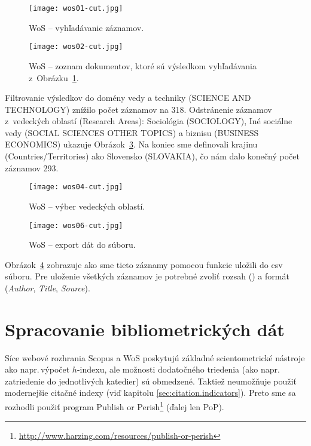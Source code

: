 \begin{figure}
  \centering
  \texttt{[image: wos01-cut.jpg]}
  \caption{WoS -- vyhľadávanie záznamov.}
  \label{fig:wos.search}
\end{figure}

\begin{figure}
  \centering
  \texttt{[image: wos02-cut.jpg]}
  \caption{WoS -- zoznam dokumentov, ktoré sú výsledkom vyhľadávania
    z~Obrázku~\ref{fig:wos.search}.}
  \label{fig:wos.documentlist}
\end{figure}

Filtrovanie výsledkov do domény vedy a techniky (SCIENCE AND TECHNOLOGY) znížilo
počet záznamov na 318.  Odstránenie záznamov z~vedeckých oblastí (Research
Areas): Sociológia (SOCIOLOGY), Iné sociálne vedy (SOCIAL SCIENCES OTHER TOPICS)
a biznisu (BUSINESS ECONOMICS) ukazuje Obrázok~\ref{fig:wos.areaselection}.  Na
koniec sme definovali krajinu (Countries/Territories) ako Slovensko (SLOVAKIA),
čo nám dalo konečný počet záznamov 293.

\begin{figure}
  \centering
  \texttt{[image: wos04-cut.jpg]}
  \caption{WoS -- výber vedeckých oblastí.}
  \label{fig:wos.areaselection}
\end{figure}

\begin{figure}
  \centering
  \texttt{[image: wos06-cut.jpg]}
  \caption{WoS -- export dát do súboru.}
  \label{fig:wos.export}
\end{figure}

Obrázok~\ref{fig:wos.export} zobrazuje ako sme tieto záznamy pomocou funkcie
 uložili do csv súboru.  Pre uloženie všetkých
záznamov je potrebné zvoliť rozsah () a formát (\emph{Author},
\emph{Title}, \emph{Source}).


\section{Spracovanie bibliometrických dát}

Síce webové rozhrania Scopus a WoS poskytujú základné scientometrické nástroje
ako napr.\,výpočet $h$-indexu, ale možnosti dodatočného triedenia (ako
napr.\,zatriedenie do jednotlivých katedier) sú obmedzené.  Taktiež neumožňuje
použiť modernejšie citačné indexy (viď kapitolu \ref{sec:citation.indicators}).
Preto sme sa rozhodli použiť program Publish or
Perish\footnote{\url{http://www.harzing.com/resources/publish-or-perish}} (ďalej
len PoP).


